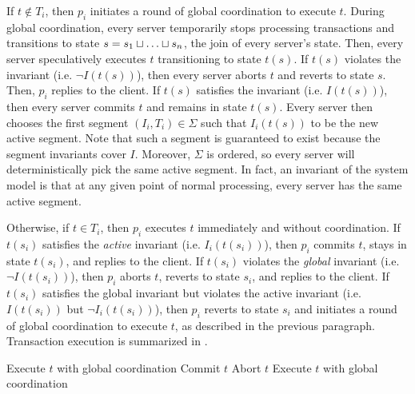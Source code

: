 If $t \notin T_i$, then $p_i$ initiates a round of global coordination to
execute $t$. During global coordination, every server temporarily stops
processing transactions and transitions to state $s = s_1 \sqcup \ldots \sqcup
s_n$, the join of every server's state. Then, every server speculatively
executes $t$ transitioning to state $t(s)$. If $t(s)$ violates the invariant
(i.e.  $\lnot I(t(s))$), then every server aborts $t$ and reverts to state $s$.
Then, $p_i$ replies to the client. If $t(s)$ satisfies the invariant (i.e.
$I(t(s))$), then every server commits $t$ and remains in state $t(s)$. Every
server then chooses the first segment $(I_i, T_i) \in \Sigma$ such that
$I_i(t(s))$ to be the new active segment.  Note that such a segment is
guaranteed to exist because the segment invariants cover $I$. Moreover,
$\Sigma$ is ordered, so every server will deterministically pick the same
active segment. In fact, an invariant of the system model is that at any given
point of normal processing, every server has the same active segment.

Otherwise, if $t \in T_i$, then $p_i$ executes $t$ immediately and without
coordination.  If $t(s_i)$ satisfies the \emph{active} invariant (i.e.
$I_i(t(s_i))$), then $p_i$ commits $t$, stays in state $t(s_i)$, and replies to
the client. If $t(s_i)$ violates the \emph{global} invariant (i.e. $\lnot
I(t(s_i))$), then $p_i$ aborts $t$, reverts to state $s_i$, and replies to the
client. If $t(s_i)$ satisfies the global invariant but violates the active
invariant (i.e.  $I(t(s_i))$ but $\lnot I_i(t(s_i))$), then $p_i$ reverts to
state $s_i$ and initiates a round of global coordination to execute $t$, as
described in the previous paragraph.  Transaction execution is summarized in
.

\begin{algorithm}[t]
  \caption{%
    Transaction execution in the segmented \invariantconfluence{} system model}%
  \begin{algorithmic}
      \State Execute $t$ with global coordination
    \Else{}
       Commit $t$
       Abort $t$
      \Else{} Execute $t$ with global coordination
      \EndIf{}
    \EndIf{}
  \end{algorithmic}
\end{algorithm}

